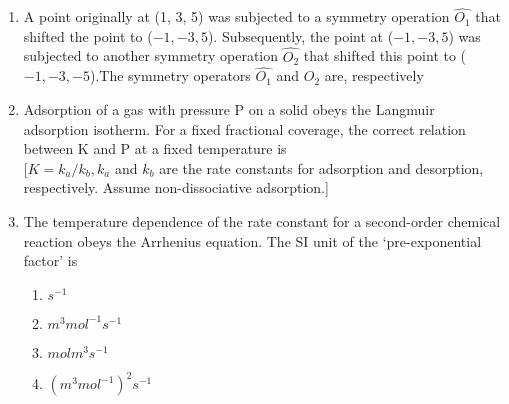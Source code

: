 \documentclass[12pt]{article}
\begin{document}
\begin{enumerate}
\item A point originally at (1, 3, 5) was subjected to a symmetry operation $\hat{O_1}$ that
shifted the point to ($-1, -3, 5$). Subsequently, the point at ($-1, -3, 5$) was
subjected to another symmetry operation $\hat{O_2}$ that shifted this point to
($-1, -3, -5$).The symmetry operators $\hat{O_1}$ and $\hat{O_2}$ are, respectively

\begin{enumerate} 
\end{enumerate}    

\item Adsorption of a gas with pressure P on a solid obeys the Langmuir adsorption
isotherm. For a fixed fractional coverage, the correct relation between K and P at a
fixed temperature is \\

[$K = k_a/k_b, k_a $ and $k_b$ are the rate constants for adsorption and desorption,
respectively. Assume non-dissociative adsorption.]

\begin{enumerate}
\end{enumerate}


\item The temperature dependence of the rate constant for a second-order chemical
reaction obeys the Arrhenius equation. The SI unit of the ‘pre-exponential factor’
is

\begin{enumerate}
    \item $s^{-1}$
    \item $m^3 mol^{-1} s^{-1}$
    \item $ mol$$ m^{3} s^{-1}$
    \item ${(m^3mol^{-1})}^2s^{-1}$   
\end{enumerate}
    


\end{enumerate}
\end{document}
